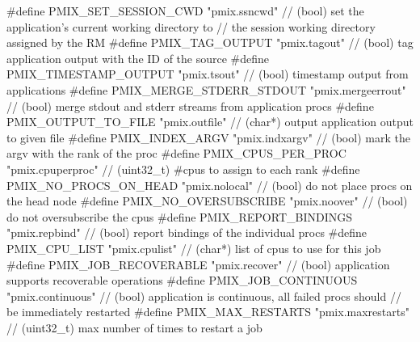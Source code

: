 \begin{codepar}
#define PMIX_SET_SESSION_CWD                "pmix.ssncwd"           // (bool) set the application's current working directory to
                                                                    //        the session working directory assigned by the RM
#define PMIX_TAG_OUTPUT                     "pmix.tagout"           // (bool) tag application output with the ID of the source
#define PMIX_TIMESTAMP_OUTPUT               "pmix.tsout"            // (bool) timestamp output from applications
#define PMIX_MERGE_STDERR_STDOUT            "pmix.mergeerrout"      // (bool) merge stdout and stderr streams from application procs
#define PMIX_OUTPUT_TO_FILE                 "pmix.outfile"          // (char*) output application output to given file
#define PMIX_INDEX_ARGV                     "pmix.indxargv"         // (bool) mark the argv with the rank of the proc
#define PMIX_CPUS_PER_PROC                  "pmix.cpuperproc"       // (uint32_t) #cpus to assign to each rank
#define PMIX_NO_PROCS_ON_HEAD               "pmix.nolocal"          // (bool) do not place procs on the head node
#define PMIX_NO_OVERSUBSCRIBE               "pmix.noover"           // (bool) do not oversubscribe the cpus
#define PMIX_REPORT_BINDINGS                "pmix.repbind"          // (bool) report bindings of the individual procs
#define PMIX_CPU_LIST                       "pmix.cpulist"          // (char*) list of cpus to use for this job
#define PMIX_JOB_RECOVERABLE                "pmix.recover"          // (bool) application supports recoverable operations
#define PMIX_JOB_CONTINUOUS                 "pmix.continuous"       // (bool) application is continuous, all failed procs should
                                                                        //        be immediately restarted
#define PMIX_MAX_RESTARTS                   "pmix.maxrestarts"      // (uint32_t) max number of times to restart a job


\end{codepar}
